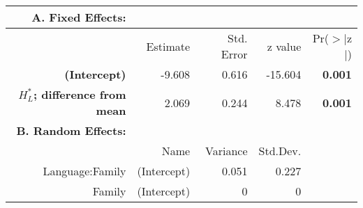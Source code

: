 \begin{tabular}{rrrrr}
 {\bf A. Fixed Effects:} \\
\hline
 & Estimate & Std. Error & z value & Pr($>$$|$z$|$) \\ 
  \hline
{\bf (Intercept) } & -9.608 & 0.616 & -15.604 & {\bf 0.001} \\ 
  {\bf $H^*_L$; difference from mean } & 2.069 & 0.244 & 8.478 & {\bf 0.001} \\ 

\hline \hline
{\bf B. Random Effects:} \\
\hline
& Name & Variance & Std.Dev. \\
\hline
Language:Family & (Intercept) & 0.051 & 0.227 \\
Family & (Intercept) & 0 & 0 \\
\end{tabular}
